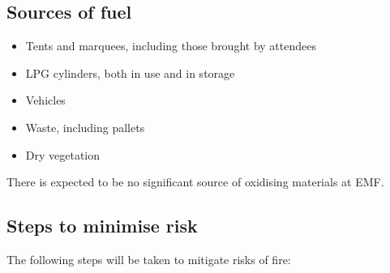 \subsection{Sources of fuel}
\begin{itemize}
    \tightlist
    \item Tents and marquees, including those brought by attendees
    \item LPG cylinders, both in use and in storage
    \item Vehicles
    \item Waste, including pallets
    \item Dry vegetation
\end{itemize}

There is expected to be no significant source of oxidising materials at EMF.

\subsection{Steps to minimise risk}
The following steps will be taken to mitigate risks of fire:

